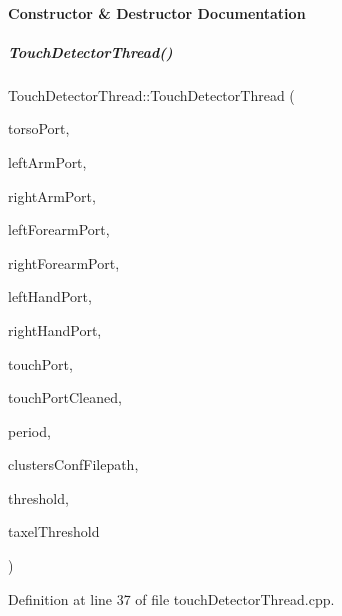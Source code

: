 \paragraph{Constructor \& Destructor Documentation}
\mbox{\label{group__touchDetector_a5c835c3a119e45a9a7c1853b11d50775}} 
\subparagraph{\texorpdfstring{Touch\+Detector\+Thread()}{TouchDetectorThread()}}
{\footnotesize\ttfamily Touch\+Detector\+Thread\+::\+Touch\+Detector\+Thread (\begin{DoxyParamCaption}\item[{yarp\+::os\+::\+Buffered\+Port$<$ yarp\+::os\+::\+Bottle $>$ $\ast$}]{torso\+Port,  }\item[{yarp\+::os\+::\+Buffered\+Port$<$ yarp\+::os\+::\+Bottle $>$ $\ast$}]{left\+Arm\+Port,  }\item[{yarp\+::os\+::\+Buffered\+Port$<$ yarp\+::os\+::\+Bottle $>$ $\ast$}]{right\+Arm\+Port,  }\item[{yarp\+::os\+::\+Buffered\+Port$<$ yarp\+::os\+::\+Bottle $>$ $\ast$}]{left\+Forearm\+Port,  }\item[{yarp\+::os\+::\+Buffered\+Port$<$ yarp\+::os\+::\+Bottle $>$ $\ast$}]{right\+Forearm\+Port,  }\item[{yarp\+::os\+::\+Buffered\+Port$<$ yarp\+::os\+::\+Bottle $>$ $\ast$}]{left\+Hand\+Port,  }\item[{yarp\+::os\+::\+Buffered\+Port$<$ yarp\+::os\+::\+Bottle $>$ $\ast$}]{right\+Hand\+Port,  }\item[{yarp\+::os\+::\+Buffered\+Port$<$ yarp\+::os\+::\+Bottle $>$ $\ast$}]{touch\+Port,  }\item[{yarp\+::os\+::\+Buffered\+Port$<$ yarp\+::os\+::\+Bottle $>$ $\ast$}]{touch\+Port\+Cleaned,  }\item[{int}]{period,  }\item[{std\+::string}]{clusters\+Conf\+Filepath,  }\item[{double}]{threshold,  }\item[{int}]{taxel\+Threshold }\end{DoxyParamCaption})}



Definition at line 37 of file touch\+Detector\+Thread.\+cpp.



